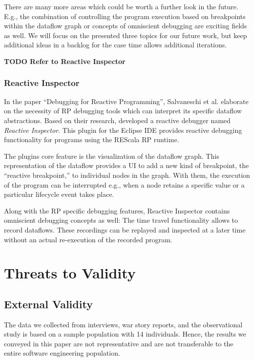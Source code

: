 \documentclass[sigplan,screen,review]{acmart}
\begin{document}
There are many more areas which could be worth a further look in the future. E.g., the combination of controlling the program execution based on breakpoints within the dataflow graph or concepts of omniscient debugging are exciting fields as well. We will focus on the presented three topics for our future work, but keep additional ideas in a backlog for the case time allows additional iterations.


\textbf{TODO Refer to Reactive Inspector}

\subsubsection{Reactive Inspector}

In the paper ``Debugging for Reactive Programming''\cite{10.1145/2884781.2884815}, Salvaneschi et al. elaborate on the necessity of RP debugging tools which can interpret its specific dataflow abstractions. Based on their research, developed a reactive debugger named \emph{Reactive Inspector}. This plugin for the Eclipse IDE provides reactive debugging functionality for programs using the REScala RP runtime.

The plugins core feature is the visualization of the dataflow graph. This representation of the dataflow provides a UI to add a new kind of breakpoint, the ``reactive breakpoint,'' to individual nodes in the graph. With them, the execution of the program can be interrupted e.g., when a node retains a specific value or a particular lifecycle event takes place.

Along with the RP specific debugging features, Reactive Inspector contains  omniscient debugging concepts as well: The time travel functionality allows to record dataflows. These recordings can be replayed and inspected at a later time without an actual re-execution of the recorded program.



\section{Threats to Validity}
\label{sec:threats}

\subsection{External Validity}

The data we collected from interviews, war story reports, and the observational study is based on a sample population with 14 individuals. Hence, the results we conveyed in this paper are not representative and are not transferable to the entire software engineering population.
\end{document}
